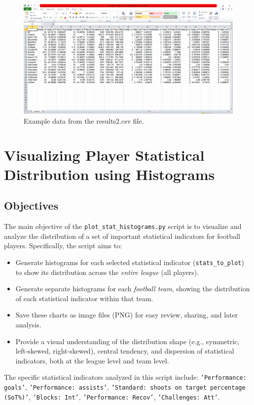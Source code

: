 \documentclass[12pt, a4paper]{report}
\begin{document}
\begin{figure}[H]
    \centering
    \includegraphics[width=\textwidth]{results2.png}
    \caption{Example data from the results2.csv file.}
    \label{fig:results2_csv}
\end{figure}

\section{Visualizing Player Statistical Distribution using Histograms}

\subsection{Objectives}
The main objective of the \texttt{plot\_stat\_histograms.py} script is to visualize and analyze the distribution of a set of important statistical indicators for football players.
Specifically, the script aims to:
\begin{itemize}
    \item Generate histograms for each selected statistical indicator (\texttt{stats\_to\_plot}) to show its distribution across the \textit{entire league} (all players).
    \item Generate separate histograms for each \textit{football team}, showing the distribution of each statistical indicator within that team.
    \item Save these charts as image files (PNG) for easy review, sharing, and later analysis.
    \item Provide a visual understanding of the distribution shape (e.g., symmetric, left-skewed, right-skewed), central tendency, and dispersion of statistical indicators, both at the league level and team level.
\end{itemize}
The specific statistical indicators analyzed in this script include: \texttt{'Performance: goals'}, \texttt{'Performance: assists'}, \texttt{'Standard: shoots on target percentage (SoT\%)'}, \texttt{'Blocks: Int'}, \texttt{'Performance: Recov'}, \texttt{'Challenges: Att'}.
\end{document}
